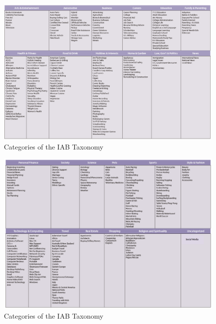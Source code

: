 %
\begin{figure}[H]
\centering
\includegraphics[width=1\textwidth]{IAB/Taxonomy-1.png}
\caption{Categories of the IAB Taxonomy}
\label{fig:IAB1}
\end{figure}
\begin{figure}[H]
\centering
\includegraphics[width=1\textwidth]{IAB/Taxonomy-2.png}
\caption{Categories of the IAB Taxonomy}
\label{fig:IAB2}
\end{figure}




